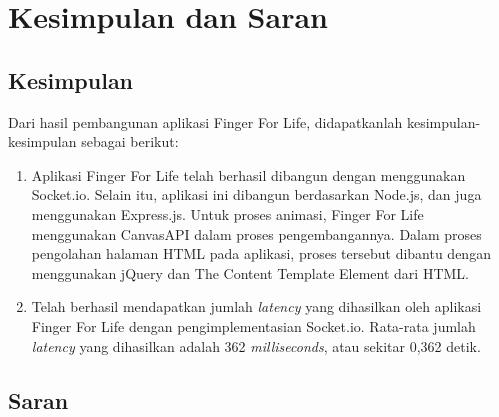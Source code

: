 \chapter{Kesimpulan dan Saran}
\label{kesimpulan}

\section{Kesimpulan}
Dari hasil pembangunan aplikasi Finger For Life, didapatkanlah kesimpulan-kesimpulan sebagai berikut:

\begin{enumerate}
	\item Aplikasi Finger For Life telah berhasil dibangun dengan menggunakan Socket.io. Selain itu, aplikasi ini dibangun berdasarkan Node.js, dan juga menggunakan Express.js. Untuk proses animasi, Finger For Life menggunakan CanvasAPI dalam proses pengembangannya. Dalam proses pengolahan halaman HTML pada aplikasi, proses tersebut dibantu dengan menggunakan jQuery dan The Content Template Element dari HTML.
	
	\item Telah berhasil mendapatkan jumlah \textit{latency} yang dihasilkan oleh aplikasi Finger For Life dengan pengimplementasian Socket.io. Rata-rata jumlah \textit{latency} yang dihasilkan adalah 362 \textit{milliseconds}, atau sekitar 0,362 detik.
\end{enumerate}

\section{Saran}